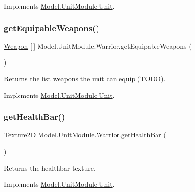 Implements \hyperlink{interface_model_1_1_unit_module_1_1_unit_accb79e396c6066707f2d11f63e3fdd99}{Model.\+Unit\+Module.\+Unit}.

\hypertarget{class_model_1_1_unit_module_1_1_warrior_a881ad4fa5437c4353abd62a56d0ab37d}{}\label{class_model_1_1_unit_module_1_1_warrior_a881ad4fa5437c4353abd62a56d0ab37d} 
\subsubsection{\texorpdfstring{get\+Equipable\+Weapons()}{getEquipableWeapons()}}
{\footnotesize\ttfamily \hyperlink{interface_model_1_1_weapon_module_1_1_weapon}{Weapon} \mbox{[}$\,$\mbox{]} Model.\+Unit\+Module.\+Warrior.\+get\+Equipable\+Weapons (\begin{DoxyParamCaption}{ }\end{DoxyParamCaption})\hspace{0.3cm}{\ttfamily [inline]}}

Returns the list weapons the unit can equip (T\+O\+DO). 

Implements \hyperlink{interface_model_1_1_unit_module_1_1_unit_a7b64e60f28d516a5fb4e28a9b7cd8eec}{Model.\+Unit\+Module.\+Unit}.

\hypertarget{class_model_1_1_unit_module_1_1_warrior_a4a2706ae17e29c3c22c30b057786e63f}{}\label{class_model_1_1_unit_module_1_1_warrior_a4a2706ae17e29c3c22c30b057786e63f} 
\subsubsection{\texorpdfstring{get\+Health\+Bar()}{getHealthBar()}}
{\footnotesize\ttfamily Texture2D Model.\+Unit\+Module.\+Warrior.\+get\+Health\+Bar (\begin{DoxyParamCaption}{ }\end{DoxyParamCaption})\hspace{0.3cm}{\ttfamily [inline]}}

Returns the healthbar texture. 

Implements \hyperlink{interface_model_1_1_unit_module_1_1_unit_a5be18da3857bb22525feb89dd49b76b1}{Model.\+Unit\+Module.\+Unit}.


